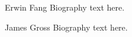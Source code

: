 \documentclass[journal,comsoc]{IEEEtran}
\theoremstyle{mytheoremstyle}
\theoremstyle{mytheoremstyle}
\theoremstyle{mytheoremstyle}
\begin{document}
\begin{IEEEbiographynophoto}{Erwin Fang}
Biography text here.
\end{IEEEbiographynophoto}


\begin{IEEEbiography}{James Gross}
Biography text here.
\end{IEEEbiography}








\end{document}

